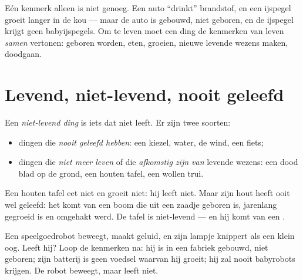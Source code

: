 \begin{remark}\label{rem:g1:living-or-not:allsigns}
Eén kenmerk alleen is niet genoeg. Een auto ``drinkt'' brandstof, en
een ijspegel groeit langer in de kou --- maar de auto is gebouwd, niet
geboren, en de ijspegel krijgt geen babyijspegels. Om te leven moet
een ding de kenmerken van leven \emph{samen} vertonen: geboren worden,
eten, groeien, nieuwe levende wezens maken, doodgaan.
\end{remark}

\section{Levend, niet-levend, nooit geleefd}

\begin{definition}\label{def:g1:living-or-not:nonliving}
Een \emph{niet-levend ding} is iets dat niet
leeft. Er zijn twee soorten:
\begin{itemize}
  \item dingen die \emph{nooit geleefd hebben}: een
        kiezel, water, de wind, een fiets;
  \item dingen die \emph{niet meer leven}
of die \emph{afkomstig zijn van} levende wezens: een dood
        blad op de grond, een houten tafel, een wollen trui.
\end{itemize}
\end{definition}

\begin{example}\label{ex:g1:living-or-not:table}
Een houten tafel eet niet en groeit niet: hij leeft niet. Maar zijn
hout heeft ooit wel geleefd: het komt van een boom die uit een zaadje
geboren is, jarenlang gegroeid is en omgehakt werd. De tafel is
niet-levend --- en hij komt van een .
\end{example}

\begin{example}\label{ex:g1:living-or-not:robot}
Een speelgoedrobot beweegt, maakt geluid, en zijn lampje knippert als
een klein oog. Leeft hij? Loop de kenmerken na: hij is in een fabriek
gebouwd, niet geboren; zijn batterij is geen voedsel waarvan hij
groeit; hij zal nooit babyrobots krijgen. De robot beweegt, maar leeft niet.
\end{example}


